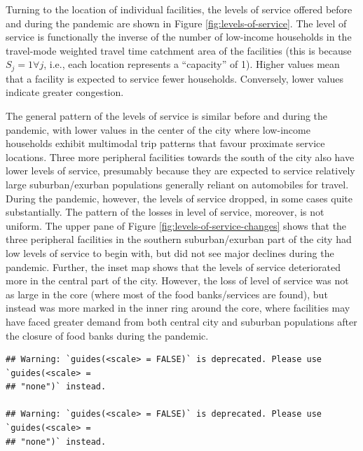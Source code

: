 \documentclass[]{elsarticle} %
\begin{document}
Turning to the location of individual facilities, the levels of service
offered before and during the pandemic are shown in Figure
\ref{fig:levels-of-service}. The level of service is functionally the
inverse of the number of low-income households in the travel-mode
weighted travel time catchment area of the facilities (this is because
\(S_j=1 \forall j\), i.e., each location represents a ``capacity'' of
1). Higher values mean that a facility is expected to service fewer
households. Conversely, lower values indicate greater congestion.

The general pattern of the levels of service is similar before and
during the pandemic, with lower values in the center of the city where
low-income households exhibit multimodal trip patterns that favour
proximate service locations. Three more peripheral facilities towards
the south of the city also have lower levels of service, presumably
because they are expected to service relatively large suburban/exurban
populations generally reliant on automobiles for travel. During the
pandemic, however, the levels of service dropped, in some cases quite
substantially. The pattern of the losses in level of service, moreover,
is not uniform. The upper pane of Figure
\ref{fig:levels-of-service-changes} shows that the three peripheral
facilities in the southern suburban/exurban part of the city had low
levels of service to begin with, but did not see major declines during
the pandemic. Further, the inset map shows that the levels of service
deteriorated more in the central part of the city. However, the loss of
level of service was not as large in the core (where most of the food
banks/services are found), but instead was more marked in the inner ring
around the core, where facilities may have faced greater demand from
both central city and suburban populations after the closure of food
banks during the pandemic.

\begin{verbatim}
## Warning: `guides(<scale> = FALSE)` is deprecated. Please use `guides(<scale> =
## "none")` instead.

## Warning: `guides(<scale> = FALSE)` is deprecated. Please use `guides(<scale> =
## "none")` instead.
\end{verbatim}
\end{document}
